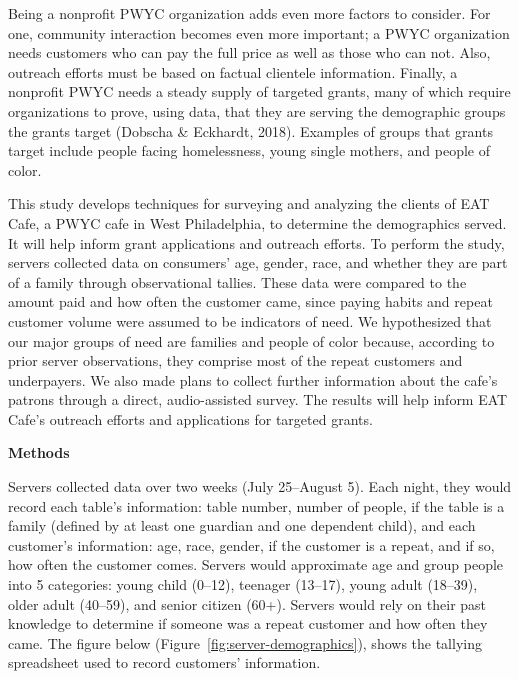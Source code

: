 Being a nonprofit PWYC organization adds even more factors to consider. For one, community interaction becomes even more important; a PWYC organization needs customers who can pay the full price as well as those who can not. Also, outreach efforts must be based on factual clientele information. Finally, a nonprofit PWYC needs a steady supply of targeted grants, many of which require organizations to prove, using data, that they are serving the demographic groups the grants target (Dobscha \& Eckhardt, 2018). Examples of groups that grants target include people facing homelessness, young single mothers, and people of color.

This study develops techniques for surveying and analyzing the clients of EAT Cafe, a PWYC cafe in West Philadelphia, to determine the demographics served. It will help inform grant applications and outreach efforts. To perform the study, servers collected data on consumers’ age, gender, race, and whether they are part of a family through observational tallies. These data were compared to the amount paid and how often the customer came, since paying habits and repeat customer volume were assumed to be indicators of need. We hypothesized that our major groups of need are families and people of color because, according to prior server observations, they comprise most of the repeat customers and underpayers. We also made plans to collect further information about the cafe’s patrons through a direct, audio-assisted survey. The results will help inform EAT Cafe’s outreach efforts and applications for targeted grants.

\textbf{Methods}

Servers collected data over two weeks (July 25--August 5). Each night, they would record each table’s information: table number, number of people, if the table is a family (defined by at least one guardian and one dependent child), and each customer’s information: age, race, gender, if the customer is a repeat, and if so, how often the customer comes. Servers would approximate age and group people into 5 categories: young child (0--12), teenager (13--17), young adult (18--39), older adult (40--59), and senior citizen (60+). Servers would rely on their past knowledge to determine if someone was a repeat customer and how often they came. The figure below (Figure~\ref{fig:server-demographics}), shows the tallying spreadsheet used to record customers’ information.

